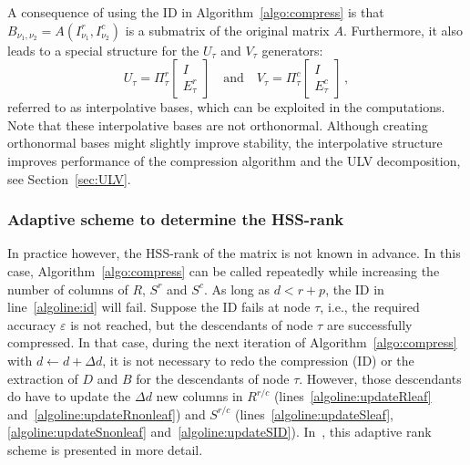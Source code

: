 \documentclass{article}
\begin{document}
A consequence of using the ID in Algorithm~\ref{algo:compress} is that
$B_{\nu_1,\nu_2} = A(I^r_{\nu_1}, I^c_{\nu_2})$ is a submatrix of the
original matrix $A$. Furthermore, it also leads to a special structure
for the $U_\tau$ and $V_\tau$ generators:
\begin{equation}
  U_\tau = \Pi^r_\tau \begin{bmatrix} I \\ E^r_\tau \end{bmatrix} \quad \textrm{and} \quad 
  V_\tau = \Pi^c_\tau \begin{bmatrix} I \\ E^c_\tau \end{bmatrix} \, ,
  \label{eq:UVstructure}
\end{equation}
referred to as interpolative bases, which can be exploited in the
computations. Note that these interpolative bases are not
orthonormal. Although creating orthonormal bases might slightly
improve stability, the interpolative structure improves performance of
the compression algorithm and the ULV decomposition, see
Section~\ref{sec:ULV}.

\subsubsection{Adaptive scheme to determine the HSS-rank}\label{sec:HSS_comp_adaptive}
In practice however, the HSS-rank of the matrix is not known in
advance. In this case, Algorithm~\ref{algo:compress} can be called
repeatedly while increasing the number of columns of $R$, $S^r$ and
$S^c$. As long as $d < r+p$, the ID in line~\ref{algoline:id} will
fail. Suppose the ID fails at node $\tau$, i.e., the required accuracy
$\varepsilon$ is not reached, but the descendants of node $\tau$ are
successfully compressed. In that case, during the next iteration of
Algorithm~\ref{algo:compress} with $d \leftarrow d + \Delta d$, it is
not necessary to redo the compression (ID) or the extraction of $D$
and $B$ for the descendants of node $\tau$. However, those descendants
do have to update the $\Delta d$ new columns in $R^{r/c}$
(lines~\ref{algoline:updateRleaf} and~\ref{algoline:updateRnonleaf})
and $S^{r/c}$ (lines~\ref{algoline:updateSleaf},
\ref{algoline:updateSnonleaf}
and~\ref{algoline:updateSID}). In~\cite{FHR}, this adaptive rank
scheme is presented in more detail.
\end{document}
